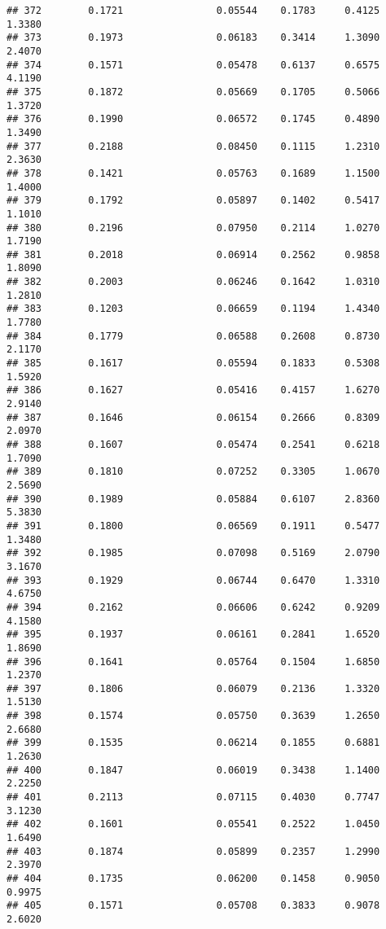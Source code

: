 \documentclass[
]{article}
\begin{document}
\begin{verbatim}
## 372        0.1721                0.05544    0.1783     0.4125       1.3380
## 373        0.1973                0.06183    0.3414     1.3090       2.4070
## 374        0.1571                0.05478    0.6137     0.6575       4.1190
## 375        0.1872                0.05669    0.1705     0.5066       1.3720
## 376        0.1990                0.06572    0.1745     0.4890       1.3490
## 377        0.2188                0.08450    0.1115     1.2310       2.3630
## 378        0.1421                0.05763    0.1689     1.1500       1.4000
## 379        0.1792                0.05897    0.1402     0.5417       1.1010
## 380        0.2196                0.07950    0.2114     1.0270       1.7190
## 381        0.2018                0.06914    0.2562     0.9858       1.8090
## 382        0.2003                0.06246    0.1642     1.0310       1.2810
## 383        0.1203                0.06659    0.1194     1.4340       1.7780
## 384        0.1779                0.06588    0.2608     0.8730       2.1170
## 385        0.1617                0.05594    0.1833     0.5308       1.5920
## 386        0.1627                0.05416    0.4157     1.6270       2.9140
## 387        0.1646                0.06154    0.2666     0.8309       2.0970
## 388        0.1607                0.05474    0.2541     0.6218       1.7090
## 389        0.1810                0.07252    0.3305     1.0670       2.5690
## 390        0.1989                0.05884    0.6107     2.8360       5.3830
## 391        0.1800                0.06569    0.1911     0.5477       1.3480
## 392        0.1985                0.07098    0.5169     2.0790       3.1670
## 393        0.1929                0.06744    0.6470     1.3310       4.6750
## 394        0.2162                0.06606    0.6242     0.9209       4.1580
## 395        0.1937                0.06161    0.2841     1.6520       1.8690
## 396        0.1641                0.05764    0.1504     1.6850       1.2370
## 397        0.1806                0.06079    0.2136     1.3320       1.5130
## 398        0.1574                0.05750    0.3639     1.2650       2.6680
## 399        0.1535                0.06214    0.1855     0.6881       1.2630
## 400        0.1847                0.06019    0.3438     1.1400       2.2250
## 401        0.2113                0.07115    0.4030     0.7747       3.1230
## 402        0.1601                0.05541    0.2522     1.0450       1.6490
## 403        0.1874                0.05899    0.2357     1.2990       2.3970
## 404        0.1735                0.06200    0.1458     0.9050       0.9975
## 405        0.1571                0.05708    0.3833     0.9078       2.6020

\end{verbatim}
\end{document}
